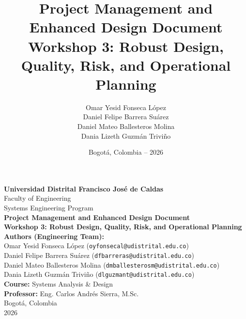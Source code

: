 \documentclass[12pt,a4paper]{article}
\title{Project Management and Enhanced Design Document\\[0.3cm]
\large Workshop 3: Robust Design, Quality, Risk, and Operational Planning}
\author{
Omar Yesid Fonseca López \\
Daniel Felipe Barrera Suárez \\
Daniel Mateo Ballesteros Molina \\
Dania Lizeth Guzmán Triviño
}
\date{Bogotá, Colombia -- 2026}
\begin{document}
\begin{titlepage}
    \centering
    \vspace*{1cm}
    {\Large \textbf{Universidad Distrital Francisco José de Caldas}} \\
    \vspace{0.4cm}
    {\large Faculty of Engineering \\ Systems Engineering Program} \\
    \vspace{2.5cm}
    {\Huge \textbf{Project Management and Enhanced Design Document}} \\
    \vspace{0.5cm}
    {\Large \textbf{Workshop 3: Robust Design, Quality, Risk, and Operational Planning}} \\
    \vspace{2cm}
    \textbf{Authors (Engineering Team):} \\
    Omar Yesid Fonseca López (\texttt{oyfonsecal@udistrital.edu.co}) \\
    Daniel Felipe Barrera Suárez (\texttt{dfbarreras@udistrital.edu.co}) \\
    Daniel Mateo Ballesteros Molina (\texttt{dmballesterosm@udistrital.edu.co}) \\
    Dania Lizeth Guzmán Triviño (\texttt{dlguzmant@udistrital.edu.co}) \\
    \vfill
    \textbf{Course:} Systems Analysis \& Design \\
    \textbf{Professor:} Eng. Carlos Andrés Sierra, M.Sc. \\
    \vspace{1cm}
    Bogotá, Colombia \\
    2026
\end{titlepage}

\end{document}
